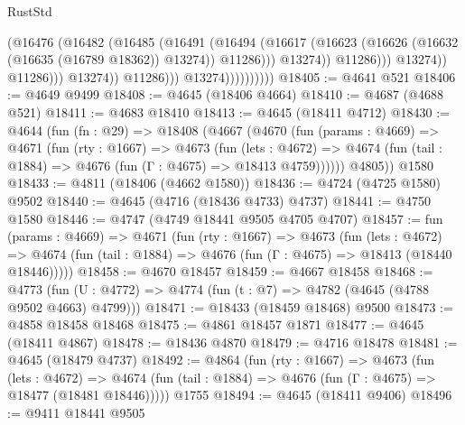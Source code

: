 \begin{lexlean}{RustStd}
\begin{coremodule}
                                              (@16476
                                                (@16482
                                                  (@16485
                                                    (@16491
                                                      (@16494
                                                        (@16617
                                                          (@16623
                                                            (@16626
                                                              (@16632
                                                                (@16635 (@16789 @18362))
                                                                @13274))
                                                            @11286)))
                                                      @13274))
                                                  @11286)))
                                            @13274))
                                        @11286)))
                                  @13274))
                              @11286)))
                        @13274))))))))))
@18405 := @4641 @521
@18406 := @4649 @9499
@18408 := @4645 (@18406 @4664)
@18410 := @4687 (@4688 @521)
@18411 := @4683 @18410
@18413 := @4645 (@18411 @4712)
@18430 := @4644
    (fun (fn : @29) =>
    @18408
      (@4667
        (@4670
          (fun (params : @4669) =>
          @4671
            (fun (rty : @1667) =>
            @4673
              (fun (lets : @4672) =>
              @4674 (fun (tail : @1884) => @4676 (fun (Γ : @4675) => @18413 @4759))))))
        @4805))
    @1580
@18433 := @4811 (@18406 (@4662 @1580))
@18436 := @4724 (@4725 @1580) @9502
@18440 := @4645 (@4716 (@18436 @4733) @4737)
@18441 := @4750 @1580
@18446 := @4747 (@4749 @18441 @9505 @4705 @4707)
@18457 := fun (params : @4669) =>
  @4671
    (fun (rty : @1667) =>
    @4673
      (fun (lets : @4672) =>
      @4674 (fun (tail : @1884) => @4676 (fun (Γ : @4675) => @18413 (@18440 @18446)))))
@18458 := @4670 @18457
@18459 := @4667 @18458
@18468 := @4773 (fun (U : @4772) => @4774 (fun (t : @7) => @4782 (@4645 (@4788 @9502 @4663) @4799)))
@18471 := @18433 (@18459 @18468) @9500
@18473 := @4858 @18458 @18468
@18475 := @4861 @18457 @1871
@18477 := @4645 (@18411 @4867)
@18478 := @18436 @4870
@18479 := @4716 @18478
@18481 := @4645 (@18479 @4737)
@18492 := @4864
    (fun (rty : @1667) =>
    @4673
      (fun (lets : @4672) =>
      @4674 (fun (tail : @1884) => @4676 (fun (Γ : @4675) => @18477 (@18481 @18446)))))
    @1755
@18494 := @4645 (@18411 @9406)
@18496 := @9411 @18441 @9505

\end{coremodule}
\end{lexlean}
